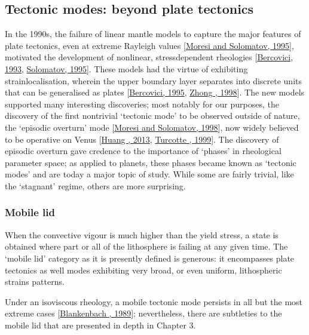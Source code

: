 \documentclass[letterpaper,10pt,english]{jupyterBook}
\begin{document}
\subsection{Tectonic modes: beyond plate tectonics}
\label{\detokenize{content/chapter_01_background/main:tectonic-modes-beyond-plate-tectonics}}
\sphinxAtStartPar
In the 1990s, the failure of linear mantle models to capture the major features of plate tectonics, even at extreme Rayleigh values {[}\hyperlink{cite.references:id384}{Moresi and Solomatov, 1995}{]}, motivated the development of non\sphinxhyphen{}linear, stress\sphinxhyphen{}dependent rheologies {[}\hyperlink{cite.references:id539}{Bercovici, 1993}, \hyperlink{cite.references:id360}{Solomatov, 1995}{]}. These models had the virtue of exhibiting strain\sphinxhyphen{}localisation, wherein the upper boundary layer separates into discrete units that can be generalised as plates {[}\hyperlink{cite.references:id540}{Bercovici, 1995}, \hyperlink{cite.references:id380}{Zhong , 1998}{]}. The new models supported many interesting discoveries; most notably for our purposes, the discovery of the first non\sphinxhyphen{}trivial ‘tectonic mode’ to be observed outside of nature, the ‘episodic overturn’ mode {[}\hyperlink{cite.references:id401}{Moresi and Solomatov, 1998}{]}, now widely believed to be operative on Venus {[}\hyperlink{cite.references:id226}{Huang , 2013}, \hyperlink{cite.references:id106}{Turcotte , 1999}{]}. The discovery of episodic overturn gave credence to the importance of ‘phases’ in rheological parameter space; as applied to planets, these phases became known as ‘tectonic modes’ and are today a major topic of study. While some are fairly trivial, like the ‘stagnant’ regime, others are more surprising.


\subsubsection{Mobile lid}
\label{\detokenize{content/chapter_01_background/main:mobile-lid}}
\sphinxAtStartPar
When the convective vigour is much higher than the yield stress, a state is obtained where part or all of the lithosphere is failing at any given time. The ‘mobile lid’ category as it is presently defined is generous: it encompasses plate tectonics as well modes exhibiting very broad, or even uniform, lithospheric strains patterns.

\sphinxAtStartPar
Under an isoviscous rheology, a mobile tectonic mode persists in all but the most extreme cases {[}\hyperlink{cite.references:id372}{Blankenbach , 1989}{]}; nevertheless, there are subtleties to the mobile lid that are presented in depth in Chapter 3.
\end{document}
